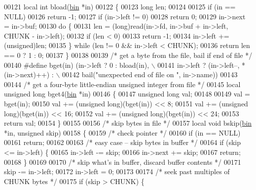 \begin{DoxyCode}
{00121 local \textcolor{keywordtype}{int} bload(\hyperlink{structbin}{bin} *in)
00122 \{
00123     \textcolor{keywordtype}{long} len;
00124 
00125     \textcolor{keywordflow}{if} (in == NULL)
00126         \textcolor{keywordflow}{return} -1;
00127     \textcolor{keywordflow}{if} (in->left != 0)
00128         \textcolor{keywordflow}{return} 0;
00129     in->next = in->buf;
00130     \textcolor{keywordflow}{do} \{
00131         len = (long)read(in->fd, in->buf + in->left, CHUNK - in->left);
00132         \textcolor{keywordflow}{if} (len < 0)
00133             \textcolor{keywordflow}{return} -1;
00134         in->left += (unsigned)len;
00135     \} \textcolor{keywordflow}{while} (len != 0 && in->left < CHUNK);
00136     \textcolor{keywordflow}{return} len == 0 ? 1 : 0;
00137 \}
00138 
00139 \textcolor{comment}{/* get a byte from the file, bail if end of file */}
00140 \textcolor{preprocessor}{#define bget(in) (in->left ? 0 : bload(in), \(\backslash\)}
00141 \textcolor{preprocessor}{                  in->left ? (in->left--, *(in->next)++) : \(\backslash\)}
00142 \textcolor{preprocessor}{                    bail("unexpected end of file on ", in->name))}
00143 
00144 \textcolor{comment}{/* get a four-byte little-endian unsigned integer from file */}
00145 local \textcolor{keywordtype}{unsigned} \textcolor{keywordtype}{long} bget4(\hyperlink{structbin}{bin} *in)
00146 \{
00147     \textcolor{keywordtype}{unsigned} \textcolor{keywordtype}{long} val;
00148 
00149     val = bget(in);
00150     val += (\textcolor{keywordtype}{unsigned} long)(bget(in)) << 8;
00151     val += (\textcolor{keywordtype}{unsigned} long)(bget(in)) << 16;
00152     val += (\textcolor{keywordtype}{unsigned} long)(bget(in)) << 24;
00153     \textcolor{keywordflow}{return} val;
00154 \}
00155 
00156 \textcolor{comment}{/* skip bytes in file */}
00157 local \textcolor{keywordtype}{void} bskip(\hyperlink{structbin}{bin} *in, \textcolor{keywordtype}{unsigned} skip)
00158 \{
00159     \textcolor{comment}{/* check pointer */}
00160     \textcolor{keywordflow}{if} (in == NULL)
00161         \textcolor{keywordflow}{return};
00162 
00163     \textcolor{comment}{/* easy case -- skip bytes in buffer */}
00164     \textcolor{keywordflow}{if} (skip <= in->left) \{
00165         in->left -= skip;
00166         in->next += skip;
00167         \textcolor{keywordflow}{return};
00168     \}
00169 
00170     \textcolor{comment}{/* skip what's in buffer, discard buffer contents */}
00171     skip -= in->left;
00172     in->left = 0;
00173 
00174     \textcolor{comment}{/* seek past multiples of CHUNK bytes */}
00175     \textcolor{keywordflow}{if} (skip > CHUNK) \{
}
\end{DoxyCode}
